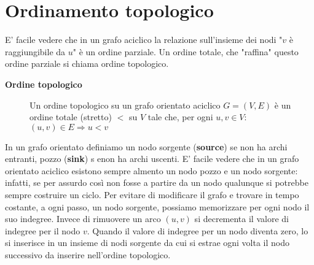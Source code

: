 \documentclass[12pt]{article}
\begin{document}
\section{Ordinamento topologico}
E' facile vedere che  in un grafo aciclico la relazione sull'insieme dei nodi "$v$ è raggiungibile da $u$" è un ordine parziale. Un ordine totale, che "raffina" questo ordine parziale si chiama ordine topologico.
\begin{description}
    \item[\textbf{Ordine topologico}] Un ordine topologico su un grafo orientato aciclico $G=(V,E)$ è un ordine totale (stretto) $<$ su $V$ tale che, per ogni $u,v\in V$: $(u,v)\in E\Rightarrow u<v$ 
\end{description}
In un grafo orientato definiamo un nodo sorgente (\textbf{source}) se non ha archi entranti, pozzo (\textbf{sink}) s enon ha archi uscenti. E' facile vedere che in un grafo orientato aciclico esistono sempre almento un nodo pozzo e un nodo sorgente: infatti, se per assurdo così non fosse a partire da un nodo qualunque si potrebbe sempre costruire un ciclo. Per evitare di modificare il grafo e trovare in tempo costante, a ogni passo, un nodo sorgente, possiamo memorizzare per ogni nodo il suo indegree. Invece di rimuovere un arco $(u,v)$ si decrementa il valore di indegree per il nodo $v$. Quando il valore di indegree per un nodo diventa zero, lo si inserisce in un insieme di nodi sorgente da cui si estrae ogni volta il nodo successivo da inserire nell'ordine topologico. 
\end{document}
